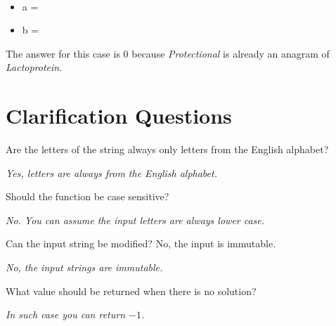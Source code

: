 \begin{exercise}
	\begin{example}
		\hfill \\
		\begin{itemize}
			\item[] 	a = 
			\item[] 	b = 
		\end{itemize}
		The answer for this case is $0$ because \emph{Protectional} is already an anagram of \emph{Lactoprotein}.
	\end{example}
\end{exercise}

\section{Clarification Questions}

\begin{QandA}
	\begin{questionitem} \begin{question} Are the letters of the string always only letters from the English alphabet?    \end{question}      
    \begin{answered}
		\textit{Yes, letters are always from the English alphabet.}
	\end{answered} \end{questionitem}
	
	\begin{questionitem} \begin{question} Should the function be case sensitive?   \end{question}      
    \begin{answered}
		\textit{ No. You can assume the input letters are always lower case.}
	\end{answered} \end{questionitem}
	\begin{questionitem} \begin{question} Can the input string be modified? No, the input is immutable.  \end{question}      
    \begin{answered}
		\textit{No, the input strings are immutable.}
	\end{answered} \end{questionitem}

	\begin{questionitem} \begin{question} What value should be returned when there is no solution?  \end{question}      
    \begin{answered}
		\textit{In such case you can return $-1$.}
	\end{answered} \end{questionitem}
\end{QandA}

